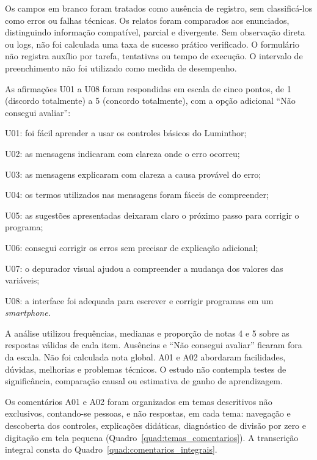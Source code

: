 \documentclass[
    12pt
    ,oneside
    ,a4paper
    ,chapter=TITLE
    ,section=TITLE
    ,sumario=abnt-6027-2012]{abntex2}
\begin{document}
Os campos em branco foram tratados como ausência de registro, sem classificá-los como
erros ou falhas técnicas. Os relatos foram comparados aos enunciados, distinguindo
informação compatível, parcial e divergente. Sem observação direta ou logs, não foi
calculada uma taxa de sucesso prático verificado. O formulário não registra auxílio
por tarefa, tentativas ou tempo de execução. O intervalo de preenchimento não foi
utilizado como medida de desempenho.

As afirmações U01 a U08 foram respondidas em escala de cinco pontos, de 1 (discordo
totalmente) a 5 (concordo totalmente), com a opção adicional ``Não consegui avaliar'':

\begin{alineas}
    \item U01: foi fácil aprender a usar os controles básicos do Luminthor;
    \item U02: as mensagens indicaram com clareza onde o erro ocorreu;
    \item U03: as mensagens explicaram com clareza a causa provável do erro;
    \item U04: os termos utilizados nas mensagens foram fáceis de compreender;
    \item U05: as sugestões apresentadas deixaram claro o próximo passo para corrigir o programa;
    \item U06: consegui corrigir os erros sem precisar de explicação adicional;
    \item U07: o depurador visual ajudou a compreender a mudança dos valores das variáveis;
    \item U08: a interface foi adequada para escrever e corrigir programas em um \textit{smartphone}.
\end{alineas}

A análise utilizou frequências, medianas e proporção de notas 4 e 5 sobre as respostas
válidas de cada item. Ausências e ``Não consegui avaliar'' ficaram fora da escala.
Não foi calculada nota global. A01 e A02 abordaram facilidades, dúvidas, melhorias e
problemas técnicos. O estudo não contempla testes de significância, comparação
causal ou estimativa de ganho de aprendizagem.

Os comentários A01 e A02 foram organizados em temas descritivos não exclusivos,
contando-se pessoas, e não respostas, em cada tema: navegação e descoberta dos
controles, explicações didáticas, diagnóstico de divisão por zero e digitação em
tela pequena (Quadro~\ref{quad:temas_comentarios}). A transcrição integral consta do
Quadro~\ref{quad:comentarios_integrais}.
\end{document}
